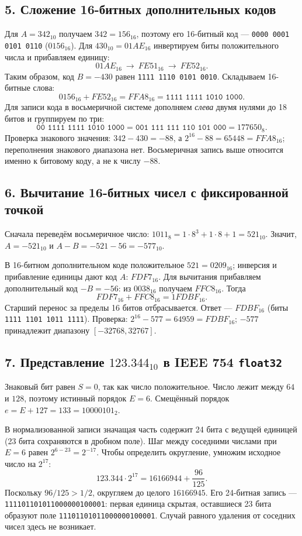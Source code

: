 \subsection*{5. Сложение 16-битных дополнительных кодов}
Для $A=342_{10}$ получаем $342=156_{16}$, поэтому его 16-битный код --- \texttt{0000 0001 0101 0110} ($0156_{16}$). Для $430_{10}=01AE_{16}$ инвертируем биты положительного числа и прибавляем единицу:
\[
01AE_{16}\ \longrightarrow\ FE51_{16}\ \longrightarrow\ FE52_{16}.
\]
Таким образом, код $B=-430$ равен \texttt{1111 1110 0101 0010}. Складываем 16-битные слова:
\[
0156_{16}+FE52_{16}=FFA8_{16}
=\texttt{1111 1111 1010 1000}.
\]
Для записи кода в восьмеричной системе дополняем \emph{слева} двумя нулями до 18 битов и группируем по три:
\[
\texttt{00 1111 1111 1010 1000}
=\texttt{001 111 111 110 101 000}
=\boxed{177650_8}.
\]
Проверка знакового значения: $342-430=-88$, а $2^{16}-88=65448=FFA8_{16}$; переполнения знакового диапазона нет. Восьмеричная запись выше относится именно к битовому коду, а не к числу $-88$.

\subsection*{6. Вычитание 16-битных чисел с фиксированной точкой}
\enlargethispage{3\baselineskip}
Сначала переведём восьмеричное число: $1011_8=1\cdot8^3+1\cdot8+1=521_{10}$. Значит, $A=-521_{10}$ и $A-B=-521-56=-577_{10}$.

В 16-битном дополнительном коде положительное $521=0209_{16}$; инверсия и прибавление единицы дают код $A$: $FDF7_{16}$. Для вычитания прибавляем дополнительный код $-B=-56$: из $0038_{16}$ получаем $FFC8_{16}$. Тогда
\[
FDF7_{16}+FFC8_{16}=1FDBF_{16}.
\]
Старший перенос за пределы 16 битов отбрасывается. Ответ --- $\boxed{FDBF_{16}}$ (биты \texttt{1111 1101 1011 1111}). Проверка: $2^{16}-577=64959=FDBF_{16}$; $-577$ принадлежит диапазону $[-32768,32767]$.

\subsection*{7. Представление $123.344_{10}$ в IEEE 754 \texttt{float32}}
Знаковый бит равен $S=0$, так как число положительное. Число лежит между $64$ и $128$, поэтому истинный порядок $E=6$. Смещённый порядок $e=E+127=133=10000101_2$.

В нормализованной записи значащая часть содержит 24 бита с ведущей единицей (23 бита сохраняются в дробном поле). Шаг между соседними числами при $E=6$ равен $2^{6-23}=2^{-17}$. Чтобы определить округление, умножим исходное число на $2^{17}$:
\[
123.344\cdot2^{17}
=16166944+\frac{96}{125}.
\]
Поскольку $96/125>1/2$, округляем до целого $16166945$. Его 24-битная запись --- \texttt{111101101011000000100001}: первая единица скрытая, оставшиеся 23 бита образуют поле \texttt{11101101011000000100001}. Случай равного удаления от соседних чисел здесь не возникает.

